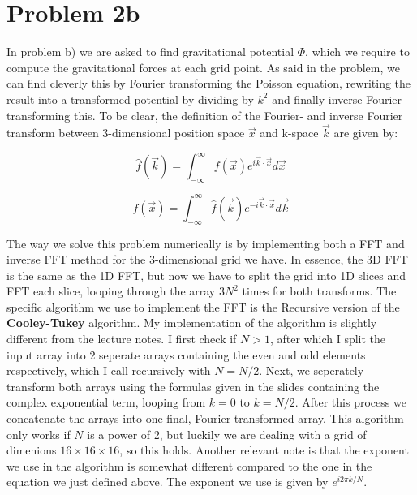 \newpage

\section*{Problem 2b}

In problem b) we are asked to find gravitational potential $\Phi$, which we require to compute the gravitational forces at each grid point. As said in the problem, we can find cleverly this by Fourier transforming the Poisson equation, rewriting the result into a transformed potential by dividing by $k^2$ and finally inverse Fourier transforming this. To be clear, the definition of the Fourier- and inverse Fourier transform between 3-dimensional position space $\vec{x}$ and k-space $\vec{k}$ are given by:

\begin{equation}
\hat{f}(\vec{k}) = \int_{-\infty}^{\infty} f(\vec{x}) e^{i \vec{k} \cdot \vec{x}}d\vec{x} 
\end{equation}

\begin{equation}
f(\vec{x}) = \int_{-\infty}^{\infty} \hat{f}(\vec{k}) e^{-i \vec{k} \cdot \vec{x}}d\vec{k} 
\end{equation}

The way we solve this problem numerically is by implementing both a FFT and inverse FFT method for the 3-dimensional grid we have. In essence, the 3D FFT is the same as the 1D FFT, but now we have to split the grid into 1D slices and FFT each slice, looping through the array $3N^2$ times for both transforms. The specific algorithm we use to implement the FFT is the Recursive version of the \textbf{Cooley-Tukey} algorithm. My implementation of the algorithm is slightly different from the lecture notes. I first check if $N>1$, after which I split the input array into 2 seperate arrays containing the even and odd elements respectively, which I call recursively with $N = N/2$. Next, we seperately transform both arrays using the formulas given in the slides containing the complex exponential term, looping from $k=0$ to $k = N/2$. After this process we concatenate the arrays into one final, Fourier transformed array. This algorithm only works if $N$ is a power of 2, but luckily we are dealing with a grid of dimenions $16 \times 16 \times 16$, so this holds. Another relevant note is that the exponent we use in the algorithm is somewhat different compared to the one in the equation we just defined above. The exponent we use is given by $e^{i 2\pi k/N}$.\\

